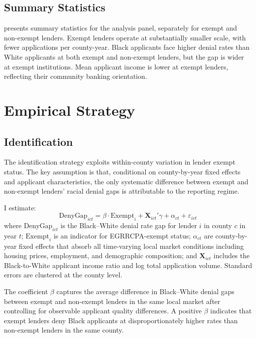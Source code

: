 \documentclass[12pt]{article}
\begin{document}
\subsection{Summary Statistics}



 presents summary statistics for the analysis panel, separately for exempt and non-exempt lenders. Exempt lenders operate at substantially smaller scale, with fewer applications per county-year. Black applicants face higher denial rates than White applicants at both exempt and non-exempt lenders, but the gap is wider at exempt institutions. Mean applicant income is lower at exempt lenders, reflecting their community banking orientation.

\section{Empirical Strategy}

\subsection{Identification}

The identification strategy exploits within-county variation in lender exempt status. The key assumption is that, conditional on county-by-year fixed effects and applicant characteristics, the only systematic difference between exempt and non-exempt lenders' racial denial gaps is attributable to the reporting regime.

I estimate:
\begin{equation}
\text{DenyGap}_{ict} = \beta \cdot \text{Exempt}_i + \mathbf{X}_{ict}'\gamma + \alpha_{ct} + \varepsilon_{ict}
\label{eq:main}
\end{equation}
where $\text{DenyGap}_{ict}$ is the Black--White denial rate gap for lender $i$ in county $c$ in year $t$; $\text{Exempt}_i$ is an indicator for EGRRCPA-exempt status; $\alpha_{ct}$ are county-by-year fixed effects that absorb all time-varying local market conditions including housing prices, employment, and demographic composition; and $\mathbf{X}_{ict}$ includes the Black-to-White applicant income ratio and log total application volume. Standard errors are clustered at the county level.

The coefficient $\beta$ captures the average difference in Black--White denial gaps between exempt and non-exempt lenders in the same local market after controlling for observable applicant quality differences. A positive $\beta$ indicates that exempt lenders deny Black applicants at disproportionately higher rates than non-exempt lenders in the same county.
\end{document}

